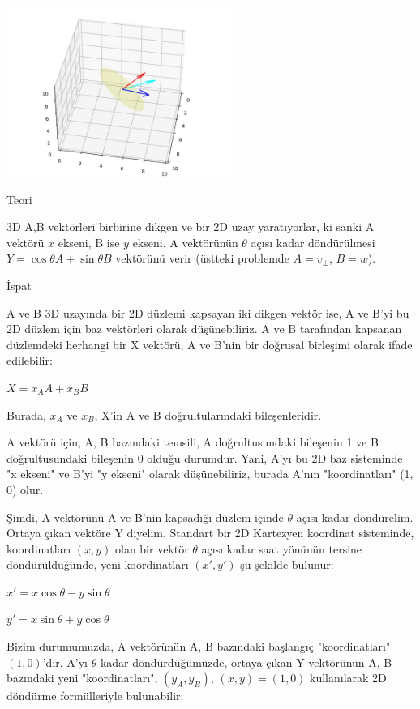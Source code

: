 \documentclass[12pt,fleqn]{article}\usepackage{../../common}
\begin{document}
\includegraphics[width=20em]{phy_073_rot_01.jpg}

Teori

3D A,B vektörleri birbirine dikgen ve bir 2D uzay yaratıyorlar, ki sanki A
vektörü $x$ ekseni, B ise $y$ ekseni. A vektörünün $\theta$ açısı kadar
döndürülmesi $Y = \cos \theta A + \sin \theta B$ vektörünü verir (üstteki
problemde $A = v_\perp$, $B = w$).

İspat

A ve B 3D uzayında bir 2D düzlemi kapsayan iki dikgen vektör ise, A ve B'yi bu
2D düzlem için baz vektörleri olarak düşünebiliriz. A ve B tarafından kapsanan
düzlemdeki herhangi bir X vektörü, A ve B'nin bir doğrusal birleşimi olarak
ifade edilebilir:

$X = x_A A + x_B B$

Burada, $x_A$ ve $x_B$, X'in A ve B doğrultularındaki bileşenleridir.

A vektörü için, {A, B} bazındaki temsili, A doğrultusundaki bileşenin
1 ve B doğrultusundaki bileşenin 0 olduğu durumdur. Yani, A'yı bu 2D
baz sisteminde "x ekseni" ve B'yi "y ekseni" olarak düşünebiliriz,
burada A'nın "koordinatları" (1, 0) olur.

Şimdi, A vektörünü A ve B'nin kapsadığı düzlem içinde $\theta$ açısı
kadar döndürelim. Ortaya çıkan vektöre Y diyelim. Standart bir 2D
Kartezyen koordinat sisteminde, koordinatları $(x, y)$ olan bir vektör
$\theta$ açısı kadar saat yönünün tersine döndürüldüğünde, yeni
koordinatları $(x', y')$ şu şekilde bulunur:

$x' = x \cos \theta - y \sin \theta$

$y' = x \sin \theta + y \cos \theta$

Bizim durumumuzda, A vektörünün {A, B} bazındaki başlangıç
"koordinatları" $(1, 0)$'dır. A'yı $\theta$ kadar döndürdüğümüzde,
ortaya çıkan Y vektörünün {A, B} bazındaki yeni "koordinatları",
$(y_A, y_B)$, $(x, y) = (1, 0)$ kullanılarak 2D döndürme formülleriyle
bulunabilir:
\end{document}
